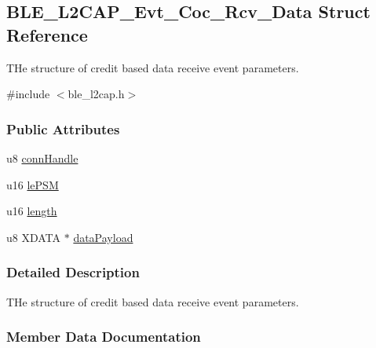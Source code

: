 \hypertarget{struct_b_l_e___l2_c_a_p___evt___coc___rcv___data}{}\subsection{B\+L\+E\+\_\+\+L2\+C\+A\+P\+\_\+\+Evt\+\_\+\+Coc\+\_\+\+Rcv\+\_\+\+Data Struct Reference}
\label{struct_b_l_e___l2_c_a_p___evt___coc___rcv___data}


T\+He structure of credit based data receive event parameters.  




{\ttfamily \#include $<$ble\+\_\+l2cap.\+h$>$}

\subsubsection*{Public Attributes}
\begin{DoxyCompactItemize}
\item 
u8 \hyperlink{struct_b_l_e___l2_c_a_p___evt___coc___rcv___data_a4552c016dedf5d83a8728b6dd18d53d4}{conn\+Handle}
\item 
u16 \hyperlink{struct_b_l_e___l2_c_a_p___evt___coc___rcv___data_afb946895285845b29fb857f7a88ea29c}{le\+P\+SM}
\item 
u16 \hyperlink{struct_b_l_e___l2_c_a_p___evt___coc___rcv___data_a80ec40b7c255fcd6913fecc7e66d37ff}{length}
\item 
u8 X\+D\+A\+TA $\ast$ \hyperlink{struct_b_l_e___l2_c_a_p___evt___coc___rcv___data_aba4a40855ca533fe45d570c48c77b79a}{data\+Payload}
\end{DoxyCompactItemize}


\subsubsection{Detailed Description}
T\+He structure of credit based data receive event parameters. 

\subsubsection{Member Data Documentation}

